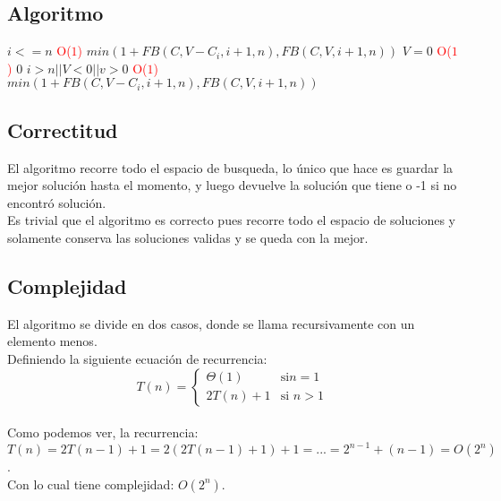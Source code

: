 \subsection{Algoritmo}


\begin{codebox}
    \li \If $i <= n$ \quad\quad\quad\quad\quad\quad\quad\quad\quad\quad\quad\quad\quad\textcolor{red}{O($1$)}
        \Then
            \Return $min(1+FB(C,V-C_{i},i+1,n),FB(C,V,i+1,n))$ \quad\quad\quad\quad\quad\quad\quad\quad
        \End
    \li \If $V = 0$ \quad\quad\quad\quad\quad\quad\quad\quad\quad\quad\quad\quad\quad\textcolor{red}{O($1$)}
        \Then
            \Return $0$ \quad\quad\quad\quad\quad\quad\quad\quad
        \End
    \li \If $i > n || V < 0 || v >0$ \quad\quad\quad\quad\quad\quad\quad\quad\quad\quad\quad\quad\quad\textcolor{red}{O($1$)}
        \Then
            \Return $min(1+FB(C,V-C_{i},i+1,n),FB(C,V,i+1,n))$ \quad\quad\quad\quad\quad\quad\quad\quad
        \End

    \end{codebox}
\subsection{Correctitud}
El algoritmo recorre todo el espacio de busqueda, lo \'unico que hace es guardar la mejor soluci\'on hasta el momento, y luego devuelve la soluci\'on que tiene o -1 si no encontr\'o soluci\'on.\\
Es trivial que el algoritmo es correcto pues recorre todo el espacio de soluciones y solamente conserva las soluciones validas y se queda con la mejor.
\subsection{Complejidad}
El algoritmo se divide en dos casos, donde se llama recursivamente con un elemento menos.\\
Definiendo la siguiente ecuaci\'on de recurrencia:\\
$$
T(n) = \left\{
\begin{array}{cl}
 \Theta (1) &\mbox{si
} n = 1 \\
2T(n)+1&\mbox{si } n > 1
\end{array}\right.
$$
\\
Como podemos ver, la recurrencia:\\ $T(n)= 2T(n-1) + 1 = 2(2T(n-1)+1)+1= ...= 2^{n-1}+ (n-1) = O(2^{n})$.\\
Con lo cual tiene complejidad: $O(2^{n})$.\\
